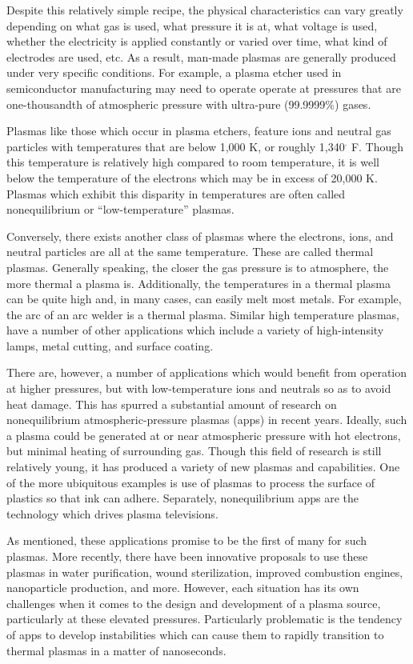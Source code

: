Despite this relatively simple recipe, the physical characteristics can vary
greatly depending on what gas is used, what pressure it is at, what voltage is
used, whether the electricity is applied constantly or varied over time, what
kind of electrodes are used, etc. As a result, man-made plasmas are generally
produced under very specific conditions. For example, a plasma etcher used in
semiconductor manufacturing may need to operate operate at pressures that are
one-thousandth of atmospheric pressure with ultra-pure (99.9999\%) gases.

Plasmas like those which occur in plasma etchers, feature ions and neutral gas
particles with temperatures that are below 1,000 K, or roughly 1,340$^\cdot$ F.
Though this temperature is relatively high compared to room temperature, it is
well below the temperature of the electrons which may be in excess of 20,000 K.
Plasmas which exhibit this disparity in temperatures are often called
nonequilibrium or ``low-temperature'' plasmas.

Conversely, there exists another class of plasmas where the electrons, ions, and
neutral particles are all at the same temperature. These are called thermal
plasmas. Generally speaking, the closer the gas pressure is to atmosphere, the
more thermal a plasma is. Additionally, the temperatures in a thermal plasma can
be quite high and, in many cases, can easily melt most metals. For example, the
arc of an arc welder is a thermal plasma. Similar high temperature plasmas, have
a number of other applications which include a variety of high-intensity lamps,
metal cutting, and surface coating.

There are, however, a number of applications which would benefit from operation
at higher pressures, but with low-temperature ions and neutrals so as to avoid
heat damage. This has spurred a substantial amount of research on nonequilibrium
atmospheric-pressure plasmas (\acs{app}s) in recent years. Ideally, such a
plasma could be generated at or near atmospheric pressure with hot electrons,
but minimal heating of surrounding gas. Though this field of research is still
relatively young, it has produced a variety of new plasmas and capabilities. One
of the more ubiquitous examples is use of plasmas to process the surface of
plastics so that ink can adhere. Separately, nonequilibrium \acs{app}s are the
technology which drives plasma televisions.

As mentioned, these applications promise to be the first of many for such
plasmas. More recently, there have been innovative proposals to use these
plasmas in water purification, wound sterilization, improved combustion engines,
nanoparticle production, and more. However, each situation has its own
challenges when it comes to the design and development of a plasma source,
particularly at these elevated pressures. Particularly problematic is the
tendency of \acs{app}s to develop instabilities which can cause them to rapidly
transition to thermal plasmas in a matter of nanoseconds.

